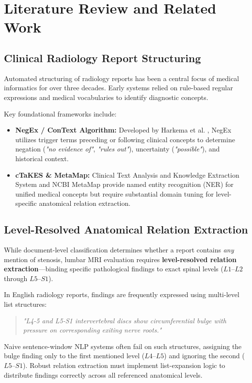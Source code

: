 \chapter{Literature Review and Related Work}
\label{ch:literature_review}

\section{Clinical Radiology Report Structuring}
Automated structuring of radiology reports has been a central focus of medical informatics for over three decades. Early systems relied on rule-based regular expressions and medical vocabularies to identify diagnostic concepts.

Key foundational frameworks include:
\begin{itemize}
    \item \textbf{NegEx / ConText Algorithm:} Developed by Harkema et al. \cite{harkema2009context}, NegEx utilizes trigger terms preceding or following clinical concepts to determine negation (\textit{"no evidence of"}, \textit{"rules out"}), uncertainty (\textit{"possible"}), and historical context.
    \item \textbf{cTaKES \& MetaMap:} Clinical Text Analysis and Knowledge Extraction System \cite{savova2010mayo} and NCBI MetaMap provide named entity recognition (NER) for unified medical concepts but require substantial domain tuning for level-specific anatomical relation extraction.
\end{itemize}

\section{Level-Resolved Anatomical Relation Extraction}
While document-level classification determines whether a report contains \textit{any} mention of stenosis, lumbar MRI evaluation requires \textbf{level-resolved relation extraction}---binding specific pathological findings to exact spinal levels ($L1$--$L2$ through $L5$--$S1$).

In English radiology reports, findings are frequently expressed using multi-level list structures:
\begin{quote}
    \textit{"L4-5 and L5-S1 intervertebral discs show circumferential bulge with pressure on corresponding exiting nerve roots."}
\end{quote}
Naive sentence-window NLP systems often fail on such structures, assigning the bulge finding only to the first mentioned level ($L4$--$L5$) and ignoring the second ($L5$--$S1$). Robust relation extraction must implement list-expansion logic to distribute findings correctly across all referenced anatomical levels.

